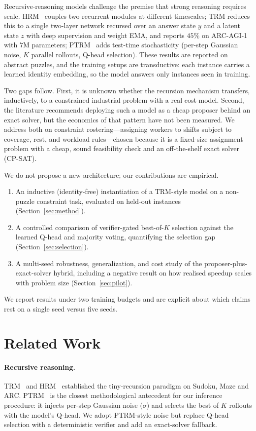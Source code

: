 \documentclass{article}
\begin{document}
Recursive-reasoning models challenge the premise that strong reasoning requires
scale. HRM~\cite{hrm} couples two recurrent modules at different timescales; TRM
\cite{trm} reduces this to a single two-layer network recursed over an answer
state $y$ and a latent state $z$ with deep supervision and weight EMA, and reports
$45\%$ on ARC-AGI-1 with $7$M parameters; PTRM~\cite{ptrm} adds test-time
stochasticity (per-step Gaussian noise, $K$ parallel rollouts, Q-head selection).
These results are reported on abstract puzzles, and the training setups are
transductive: each instance carries a learned identity embedding, so the model
answers only instances seen in training.

Two gaps follow. First, it is unknown whether the recursion mechanism transfers,
inductively, to a constrained industrial problem with a real cost model. Second,
the literature recommends deploying such a model as a cheap proposer behind an
exact solver, but the economics of that pattern have not been measured. We address
both on constraint rostering---assigning workers to shifts subject to coverage,
rest, and workload rules---chosen because it is a fixed-size assignment problem
with a cheap, sound feasibility check and an off-the-shelf exact solver (CP-SAT).

We do not propose a new architecture; our contributions are empirical.
\begin{enumerate}
\item An inductive (identity-free) instantiation of a TRM-style model on a
non-puzzle constraint task, evaluated on held-out instances
(Section~\ref{sec:method}).
\item A controlled comparison of verifier-gated best-of-$K$ selection against the
learned Q-head and majority voting, quantifying the selection gap
(Section~\ref{sec:selection}).
\item A multi-seed robustness, generalization, and cost study of the
proposer-plus-exact-solver hybrid, including a negative result on how realised
speedup scales with problem size (Section~\ref{sec:pilot}).
\end{enumerate}
We report results under two training budgets and are explicit about which claims
rest on a single seed versus five seeds.

\section{Related Work}

\paragraph{Recursive reasoning.} TRM~\cite{trm} and HRM~\cite{hrm} established the
tiny-recursion paradigm on Sudoku, Maze and ARC. PTRM~\cite{ptrm} is the closest
methodological antecedent for our inference procedure: it injects per-step
Gaussian noise ($\sigma$) and selects the best of $K$ rollouts with the model's
Q-head. We adopt PTRM-style noise but replace Q-head selection with a
deterministic verifier and add an exact-solver fallback.
\end{document}

